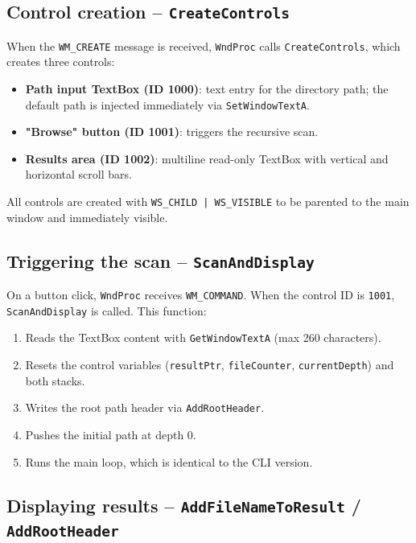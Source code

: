 \documentclass[12pt,a4paper]{article}
\begin{document}
\subsection{Control creation -- \texttt{CreateControls}}

When the \texttt{WM\_CREATE} message is received, \texttt{WndProc} calls \texttt{CreateControls}, which creates three controls:

\begin{itemize}
  \item \textbf{Path input TextBox (ID 1000)}: text entry for the directory path; the default path is injected immediately via \texttt{SetWindowTextA}.
  \item \textbf{"Browse" button (ID 1001)}: triggers the recursive scan.
  \item \textbf{Results area (ID 1002)}: multiline read-only TextBox with vertical and horizontal scroll bars.
\end{itemize}

All controls are created with \texttt{WS\_CHILD | WS\_VISIBLE} to be parented to the main window and immediately visible.

\subsection{Triggering the scan -- \texttt{ScanAndDisplay}}

On a button click, \texttt{WndProc} receives \texttt{WM\_COMMAND}. When the control ID is \texttt{1001}, \texttt{ScanAndDisplay} is called. This function:

\begin{enumerate}
  \item Reads the TextBox content with \texttt{GetWindowTextA} (max 260 characters).
  \item Resets the control variables (\texttt{resultPtr}, \texttt{fileCounter}, \texttt{currentDepth}) and both stacks.
  \item Writes the root path header via \texttt{AddRootHeader}.
  \item Pushes the initial path at depth 0.
  \item Runs the main loop, which is identical to the CLI version.
\end{enumerate}

\subsection{Displaying results -- \texttt{AddFileNameToResult} / \texttt{AddRootHeader}}
\end{document}
